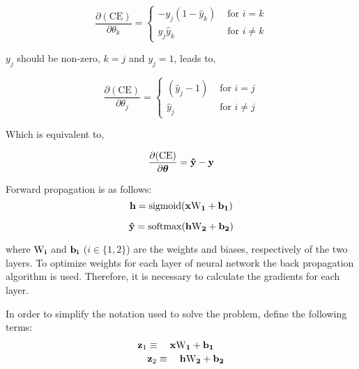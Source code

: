 \begin{equation}
\label{eq:CE_gradient}
\frac{\partial(\textrm{CE})}{\partial{\theta_{k}}} = \begin{cases}
-y_{j}(1 - \hat{y}_{k})&\text{ for }i=k \\
y_{j}\hat{y}_{k}&\text{ for }i\neq k
\end{cases}
\end{equation}

$y_{j}$ should be non-zero, $k=j$ and $y_{j}=1$, leads to,

\begin{equation}
\label{eq:equation_CE_5}
\frac{\partial(\textrm{CE})}{\partial{\theta_{j}}} = \begin{cases}
(\hat{y}_{j} - 1)&\text{ for }i=j \\
\hat{y}_{j}&\text{ for }i\neq j
\end{cases}
\end{equation}

Which is equivalent to,

\begin{equation}
\frac{\partial(\textrm{CE})}{\partial{\boldsymbol\theta}} = \bf{\hat{y}} - \bf{y}
\end{equation}

\noindent Forward propagation is as follows:
\begin{equation}
{\bf h} = \textrm{sigmoid}({\bf x\textrm{W}_{1} + b_{1}}) 
\end{equation}

\begin{equation}
\label{eq:equation2_7}
{\bf \hat{y}} = \textrm{softmax}({\bf h\textrm{W}_{2} + b_{2})}
\end{equation}

\noindent where $\bf{\textrm{W}}_i$ and $\bf{b}_{i}$ ($i\in\{1,2\}$) are
the weights and biases, respectively of the two layers.
\indent To optimize weights for each layer of neural network the back propagation algorithm is used. Therefore, it is necessary to calculate the gradients for each layer.
  
\noindent In order to simplify the notation used to solve the problem, define the following terms:
\begin{equation}
\label{eq:equation2_10}
\begin{multlined}
		 {\bf z}_{1}\equiv \quad{\bf x\textrm{W}_{1} + b_{1}} \\
		{\bf z}_{2}\equiv \quad{\bf h\textrm{W}_{2} + b_{2}}
\end{multlined}
\end{equation}

